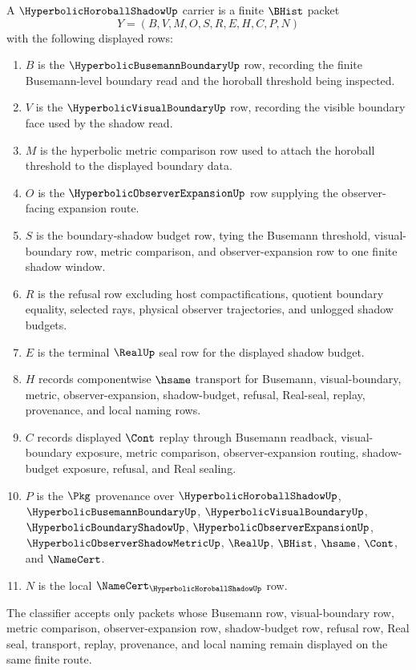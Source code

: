\begin{definition}
\label{def:hyperbolic-horoball-shadow-carrier}
A $\HyperbolicHoroballShadowUp$ carrier is a finite $\BHist$ packet
$$
Y=(B,V,M,O,S,R,E,H,C,P,N)
$$
with the following displayed rows:
\begin{enumerate}
\item $B$ is the $\HyperbolicBusemannBoundaryUp$ row, recording the finite Busemann-level boundary read and the horoball threshold being inspected.
\item $V$ is the $\HyperbolicVisualBoundaryUp$ row, recording the visible boundary face used by the shadow read.
\item $M$ is the hyperbolic metric comparison row used to attach the horoball threshold to the displayed boundary data.
\item $O$ is the $\HyperbolicObserverExpansionUp$ row supplying the observer-facing expansion route.
\item $S$ is the boundary-shadow budget row, tying the Busemann threshold, visual-boundary row, metric comparison, and observer-expansion row to one finite shadow window.
\item $R$ is the refusal row excluding host compactifications, quotient boundary equality, selected rays, physical observer trajectories, and unlogged shadow budgets.
\item $E$ is the terminal $\RealUp$ seal row for the displayed shadow budget.
\item $H$ records componentwise $\hsame$ transport for Busemann, visual-boundary, metric, observer-expansion, shadow-budget, refusal, Real-seal, replay, provenance, and local naming rows.
\item $C$ records displayed $\Cont$ replay through Busemann readback, visual-boundary exposure, metric comparison, observer-expansion routing, shadow-budget exposure, refusal, and Real sealing.
\item $P$ is the $\Pkg$ provenance over $\HyperbolicHoroballShadowUp$, $\HyperbolicBusemannBoundaryUp$, $\HyperbolicVisualBoundaryUp$, $\HyperbolicBoundaryShadowUp$, $\HyperbolicObserverExpansionUp$, $\HyperbolicObserverShadowMetricUp$, $\RealUp$, $\BHist$, $\hsame$, $\Cont$, and $\NameCert$.
\item $N$ is the local $\NameCert_{\HyperbolicHoroballShadowUp}$ row.
\end{enumerate}
The classifier accepts only packets whose Busemann row, visual-boundary row, metric comparison, observer-expansion row, shadow-budget row, refusal row, Real seal, transport, replay, provenance, and local naming remain displayed on the same finite route.
\end{definition}

